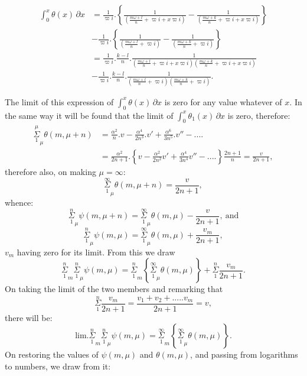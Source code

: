\documentclass{article}
\begin{document}
\[ \begin{aligned}\int_{0}^{x}\theta(x)\,\partial x&=\frac{1}{\varpi i}.\left\{\frac{1}{\left(\frac{m\omega+l}{n}+\varpi i+x\varpi i\right)}-\frac{1}{\left(\frac{m\omega+k}{n}+\varpi i+x\varpi i\right)}\right\}\\ &-\frac{1}{\varpi i}.\left\{\frac{1}{\left(\frac{m\omega+l}{n}+\varpi i\right)}-\frac{1}{\left(\frac{m\omega+k}{n}+\varpi i\right)}\right\}\\ &=\frac{1}{\varpi i}.\frac{k-l}{n}.\frac{1}{\left(\frac{m\omega+l}{n}+\varpi i+x\varpi i\right)\left(\frac{m\omega+k}{n}+\varpi i+x\varpi i\right)}\\ &-\frac{1}{\varpi i}.\frac{k-l}{n}.\frac{1}{\left(\frac{m\omega+l}{n}+\varpi i\right)\left(\frac{m\omega+k}{n}+\varpi i\right)}.\end{aligned} \]

The limit of this expression of $\displaystyle\int_{0}^{x}\theta(x)\,\partial x$ is zero for any value whatever of $x$. In the same way it will be found that the limit of $\displaystyle\int_{0}^{x}\theta_{1}(x)\,\partial x$ is zero, therefore:
\[ \begin{aligned}\overset{\mu}{\underset{1}{\Sigma}}_{\mu}\theta(m,\mu+n)&=\frac{\alpha^{2}}{n}.v-\frac{\alpha^{4}}{2n^{3}}.v'+\frac{\alpha^{6}}{3n^{5}}.v''-....\\ &=\frac{\alpha^{2}}{2n+1}.\left\{v-\frac{\alpha^{2}}{2n^{2}}v'+\frac{\alpha^{4}}{3n^{4}}v''-....\right\}\frac{2n+1}{n}=\frac{v}{2n+1},\end{aligned} \]
therefore also, on making $\mu=\infty$:
\[ \overset{\infty}{\underset{1}{\Sigma}}_{\mu}\theta(m,\mu+n)=\frac{v}{2n+1}, \]
whence:
\[ \overset{n}{\underset{1}{\Sigma}}_{\mu}\psi(m,\mu+n)=\overset{\infty}{\underset{1}{\Sigma}}_{\mu}\theta(m,\mu)-\frac{v}{2n+1},\ \text{and} \]
\[ \overset{n}{\underset{1}{\Sigma}}_{\mu}\psi(m,\mu)=\overset{\infty}{\underset{1}{\Sigma}}_{\mu}\theta(m,\mu)+\frac{v_{m}}{2n+1}, \tag{170.} \]
$v_{m}$ having zero for its limit. From this we draw
\[ \overset{n}{\underset{1}{\Sigma}}_{m}\overset{n}{\underset{1}{\Sigma}}_{\mu}\psi(m,\mu)=\overset{n}{\underset{1}{\Sigma}}_{m}\left\{\overset{\infty}{\underset{1}{\Sigma}}_{\mu}\theta(m,\mu)\right\}+\overset{n}{\underset{1}{\Sigma}}\frac{v_{m}}{2n+1}. \]
On taking the limit of the two members and remarking that
\[ \overset{n}{\underset{1}{\Sigma}}\frac{v_{m}}{2n+1}=\frac{v_{1}+v_{2}+.....v_{m}}{2n+1}=v, \]
there will be:
\[ \text{lim.}\overset{n}{\underset{1}{\Sigma}}_{m}\overset{n}{\underset{1}{\Sigma}}_{\mu}\psi(m,\mu)=\overset{\infty}{\underset{1}{\Sigma}}_{m}\left\{\overset{\infty}{\underset{1}{\Sigma}}_{\mu}\theta(m,\mu)\right\}. \tag{171.} \]
On restoring the values of $\psi(m,\mu)$ and $\theta(m,\mu)$, and passing from logarithms to numbers, we draw from it:
\end{document}
